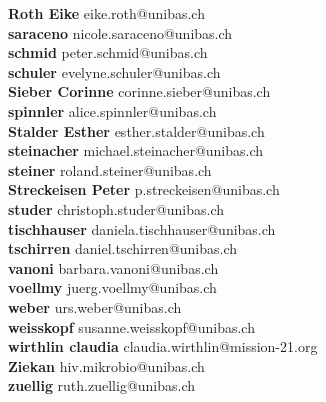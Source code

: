 \documentclass{scrartcl}
\begin{document}
\textbf{Roth Eike } eike.roth@unibas.ch\\
\textbf{saraceno } nicole.saraceno@unibas.ch\\
\textbf{schmid } peter.schmid@unibas.ch\\
\textbf{schuler } evelyne.schuler@unibas.ch\\
\textbf{Sieber Corinne } corinne.sieber@unibas.ch\\
\textbf{spinnler } alice.spinnler@unibas.ch\\
\textbf{Stalder Esther } esther.stalder@unibas.ch\\
\textbf{steinacher } michael.steinacher@unibas.ch\\
\textbf{steiner } roland.steiner@unibas.ch\\
\textbf{Streckeisen Peter } p.streckeisen@unibas.ch\\
\textbf{studer } christoph.studer@unibas.ch\\
\textbf{tischhauser } daniela.tischhauser@unibas.ch\\
\textbf{tschirren } daniel.tschirren@unibas.ch\\
\textbf{vanoni } barbara.vanoni@unibas.ch\\
\textbf{voellmy } juerg.voellmy@unibas.ch\\
\textbf{weber } urs.weber@unibas.ch\\
\textbf{weisskopf } susanne.weisskopf@unibas.ch\\
\textbf{wirthlin claudia } claudia.wirthlin@mission-21.org\\
\textbf{Ziekan } hiv.mikrobio@unibas.ch\\
\textbf{zuellig } ruth.zuellig@unibas.ch\\
\end{document}
